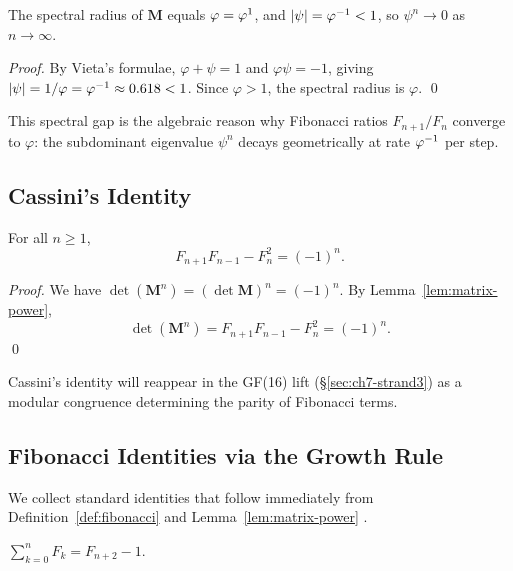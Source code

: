 \begin{lemma}\label{lem:spectral-gap}
The spectral radius of \(\mathbf{M}\) equals \(\varphi = \varphi^{1}\), and
\(|\psi| = \varphi^{-1} < 1\), so \(\psi^n \to 0\) as \(n \to \infty\).
\end{lemma}

\begin{proof}
By Vieta's formulae, \(\varphi + \psi = 1\) and \(\varphi\psi = -1\), giving
\(|\psi| = 1/\varphi = \varphi^{-1} \approx 0.618 < 1\).
Since \(\varphi > 1\), the spectral radius is \(\varphi\).
\qed
\end{proof}

This spectral gap is the algebraic reason why Fibonacci ratios
\(F_{n+1}/F_n\) converge to \(\varphi\): the subdominant eigenvalue
\(\psi^n\) decays geometrically at rate \(\varphi^{-1}\) per step.

\subsection{Cassini's Identity}\label{subsec:ch7-cassini}

\begin{proposition}\label{prop:cassini}
For all \(n \geq 1\),
\[
  F_{n+1} F_{n-1} - F_n^2 = (-1)^n.
\]
\end{proposition}

\begin{proof}
We have \(\det(\mathbf{M}^n) = (\det \mathbf{M})^n = (-1)^n\).
By Lemma~\ref{lem:matrix-power},
\[
  \det(\mathbf{M}^n) = F_{n+1}F_{n-1} - F_n^2 = (-1)^n.
\]
\qed
\end{proof}

Cassini's identity will reappear in the GF(16) lift (\S\ref{sec:ch7-strand3})
as a modular congruence determining the parity of Fibonacci terms.

\subsection{Fibonacci Identities via the Growth Rule}\label{subsec:ch7-identities}

We collect standard identities that follow immediately from
Definition~\ref{def:fibonacci} and Lemma~\ref{lem:matrix-power}
\cite{hardy_wright}.

\begin{proposition}\label{prop:sum-formula}
\(
  \sum_{k=0}^{n} F_k = F_{n+2} - 1.
\)
\end{proposition}


